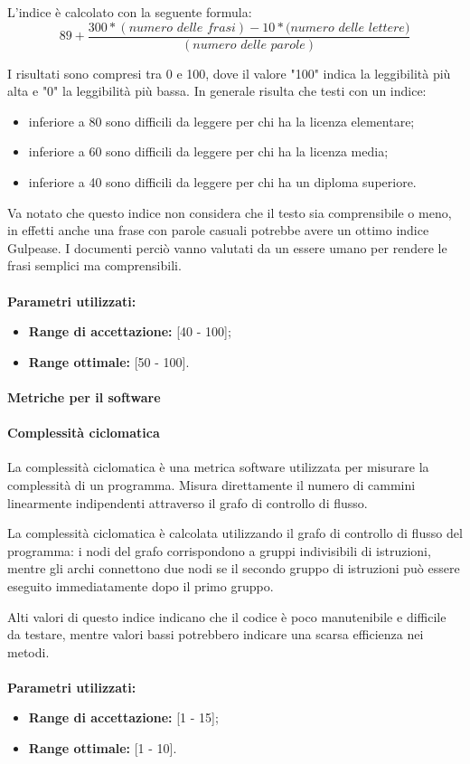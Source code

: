 \documentclass[12pt,a4paper,titlepage]{article}
\begin{document}
			L'indice è calcolato con la seguente formula:
			\[89+\frac{300*(\textit{numero delle frasi})-10*(\textit{numero delle lettere)}}{(\textit{numero delle parole})}\]
			
			I risultati sono compresi tra 0 e 100, dove il valore "100" indica la leggibilità più alta e "0" la leggibilità più bassa. In generale risulta che testi con un indice:
			\begin{itemize}
				\item inferiore a 80 sono difficili da leggere per chi ha la licenza elementare;
				\item inferiore a 60 sono difficili da leggere per chi ha la licenza media;
				\item inferiore a 40 sono difficili da leggere per chi ha un diploma superiore.
			\end{itemize}
			Va notato che questo indice non considera che il testo sia comprensibile o meno, in effetti anche una frase con parole casuali potrebbe avere un ottimo indice Gulpease. I documenti perciò vanno valutati da un essere umano per rendere le frasi semplici ma comprensibili.
			\\ \\
			\textbf{Parametri utilizzati:}
			\begin{itemize}
				\item \textbf{Range di accettazione:} [40 - 100];
				\item \textbf{Range ottimale:} [50 - 100].
			\end{itemize}
			\paragraph{Metriche per il software}
			\paragraph{Complessità ciclomatica}
			La complessità ciclomatica è una metrica software utilizzata per misurare la complessità di un programma. Misura direttamente il numero di cammini linearmente indipendenti attraverso il grafo di controllo di flusso.
			
			La complessità ciclomatica è calcolata utilizzando il grafo di controllo di flusso del programma: i nodi del grafo corrispondono a gruppi indivisibili di istruzioni, mentre gli archi connettono due nodi se il secondo gruppo di istruzioni può essere eseguito immediatamente dopo il primo gruppo.
			
			Alti valori di questo indice indicano che il codice è poco manutenibile e difficile da testare, mentre valori bassi potrebbero indicare una scarsa efficienza nei metodi. 
			\\ \\
			\textbf{Parametri utilizzati:}
			\begin{itemize}
				\item \textbf{Range di accettazione:} [1 - 15];
				\item \textbf{Range ottimale:} [1 - 10].
			\end{itemize}
\end{document}
